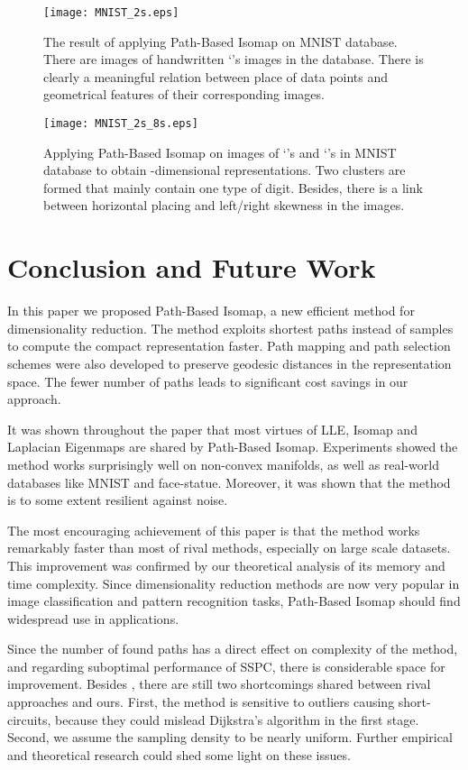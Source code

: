 \documentclass[10pt,journal,cspaper,compsoc]{IEEEtran}
\let\MYoriglatexcaption\caption
\renewcommand{\caption}[2][\relax]{\MYoriglatexcaption[#2]{#2}}
\begin{document}
\begin{figure}[b]
\centering
    \texttt{[image: MNIST\_2s.eps]}
    \caption{{\small The result of applying Path-Based Isomap on MNIST database. There are  images of handwritten `'s images in the database. There is clearly a meaningful relation between place of data points and geometrical features of their corresponding images.}}
    \label{fig_8_4}
\end{figure}

\begin{figure}[t]
\centering
    \texttt{[image: MNIST\_2s\_8s.eps]}
    \caption{{\small Applying Path-Based Isomap on  images of `'s and `'s in MNIST database to obtain -dimensional representations. Two clusters are formed that mainly contain one type of digit. Besides, there is a link between horizontal placing and left/right skewness in the images.}}
    \label{fig_8_5}
\end{figure}

\section{Conclusion and Future Work}
In this paper we proposed Path-Based Isomap, a new efficient method for dimensionality reduction. The method exploits shortest paths instead of samples to compute the compact representation faster. Path mapping and path selection schemes were also developed to preserve geodesic distances in the representation space. The fewer number of paths leads to significant cost savings in our approach.

It was shown throughout the paper that most virtues of LLE, Isomap and Laplacian Eigenmaps are shared by Path-Based Isomap. Experiments showed the method works surprisingly well on non-convex manifolds, as well as real-world databases like MNIST and face-statue. Moreover, it was shown that the method is to some extent resilient against noise. 

The most encouraging achievement of this paper is that the method works remarkably faster than most of rival methods, especially on large scale datasets. This improvement was confirmed by our theoretical analysis of its memory and time complexity. Since dimensionality reduction methods are now very popular in image classification and pattern recognition tasks, Path-Based Isomap should find widespread use in applications. 

Since the number of found paths has a direct effect on complexity of the method, and regarding suboptimal performance of SSPC, there is considerable space for improvement. Besides , there are still two shortcomings shared between rival approaches and ours. First, the method is sensitive to outliers causing short-circuits, because they could mislead Dijkstra's algorithm in the first stage. Second, we assume the sampling density to be nearly uniform. Further empirical and theoretical research could shed some light on these issues.
\end{document}
